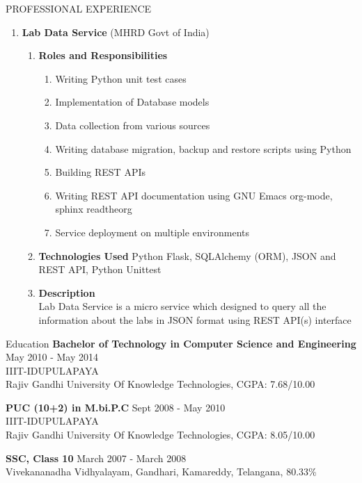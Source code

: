 \documentclass{resume} %
\newcommand{\blank}[1]{\hspace*{#1}}
\begin{document}
\begin{rSection}{PROFESSIONAL EXPERIENCE}
\begin{rSubsection}
\begin{enumerate}[label=\bfseries\arabic*]
\item \textbf {Lab Data Service} (MHRD Govt of India)
  \begin{enumerate}
  \item \textbf{Roles and Responsibilities }
    \begin{enumerate}
    \item Writing  Python unit test cases
    \item Implementation of Database models
    \item Data collection from various sources
    \item Writing database migration, backup and restore scripts using
      Python
    \item Building REST APIs
    \item Writing REST API documentation using GNU Emacs org-mode,
      sphinx readtheorg
    \item Service deployment on multiple environments
    \end{enumerate}
  \item \textbf{Technologies Used } Python Flask, SQLAlchemy (ORM),
    JSON and REST API, Python Unittest
  \item \textbf{Description } \\
    \blank{2 cm} Lab Data Service is a micro service which designed to query all the information
    about the labs in JSON format using REST API(s) interface
  \end{enumerate}
\end{enumerate}
\end{rSubsection}

\end{rSection}




\begin{rSection}{Education}
  {\bf Bachelor of Technology in Computer Science and Engineering} \hfill {May 2010 - May 2014}
  \\ 
  IIIT-IDUPULAPAYA
  \\
  Rajiv Gandhi University Of Knowledge Technologies,  CGPA: 7.68/10.00  
  
  {\bf PUC (10+2) in M.bi.P.C} \hfill {Sept 2008 - May 2010}
  \\
  IIIT-IDUPULAPAYA
  \\
  Rajiv Gandhi University Of Knowledge Technologies,  CGPA: 8.05/10.00  
  
  {\textbf{SSC, Class 10}}  \hfill March 2007 - March  2008 \\
  Vivekananadha Vidhyalayam, Gandhari, Kamareddy, Telangana, 80.33\% 

\end{rSection}
\end{document}
